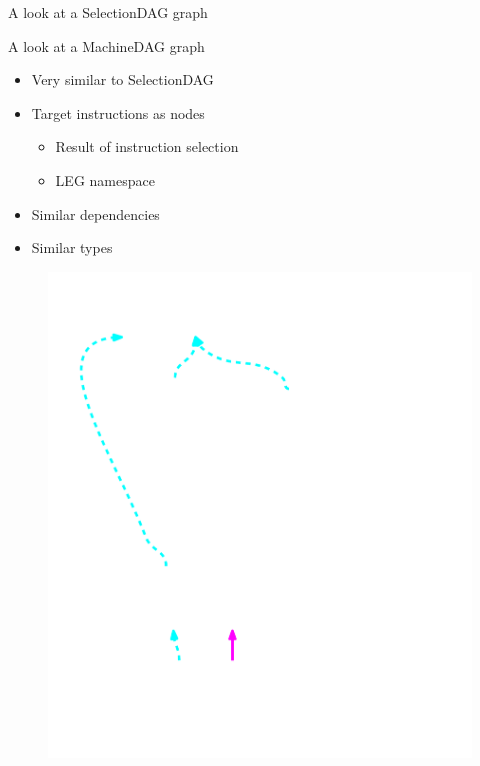 \begin{frame}{A look at a SelectionDAG graph}

\end{frame}


\begin{frame}{A look at a MachineDAG graph}

\begin{minipage}[t]{0.50\linewidth}
    \begin{itemize}
        \item Very similar to SelectionDAG
        \item Target instructions as nodes
        \begin{itemize}
            \item Result of instruction selection
            \item LEG namespace
        \end{itemize}
        \item Similar dependencies
        \item Similar types
    \end{itemize}
\end{minipage}
\begin{minipage}[t]{0.49\linewidth}
    \begin{figure}
        \vspace{-2.2ex}
        \includegraphics[width = 1.00\textwidth]{examples/ex1b/ex1b-post-isel.pdf}
    \end{figure}
\end{minipage}


\end{frame}

